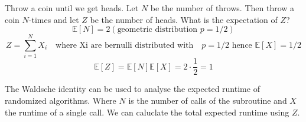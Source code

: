 \begin{example}
    Throw a coin until we get heads. Let $N$ be the number of throws. Then throw a coin $N$-times and let $Z$ be the number of heads. What is the expectation of $Z$?
    $$\mathbb{E}[N] = 2 (\text{geometric distribution } p = 1/2)$$
    $$Z = \sum_{i=1}^N X_i \quad \text{where Xi are bernulli distributed with} \quad p = 1/2 \text{ hence } \mathbb{E}[X] = 1/2$$
    $$\mathbb{E}[Z] = \mathbb{E}[N] \mathbb{E}[X] = 2 \cdot \frac{1}{2} = 1$$
\end{example}

\begin{remark}
    The Waldsche identity can be used to analyse the expected runtime of randomized algorithms. Where $N$ is the number of calls of the subroutine and $X$ the runtime of a single call. We can caluclate the total expected runtime using $Z$.
\end{remark}